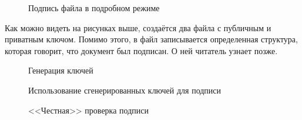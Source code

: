 \begin{figure}[h!]
  \caption{Подпись файла в подробном режиме}
\end{figure}

Как можно видеть на рисунках выше, создаётся два файла с публичным и приватным ключом. Помимо этого, в файл записывается определенная структура, которая говорит, что документ был подписан. О ней читатель узнает позже.

\begin{figure}[h!]
  \caption{Генерация ключей}
\end{figure}

\begin{figure}[h!]
  \caption{Использование сгенерированных ключей для подписи}
\end{figure}

\begin{figure}[h!]
  \caption{<<Честная>> проверка подписи}
\end{figure}